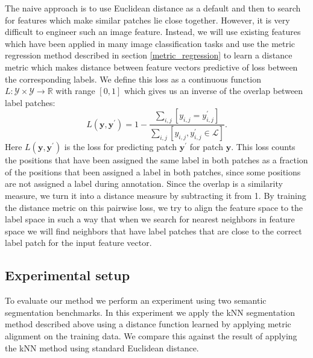 \documentclass[a4paper,titlepage]{article}
\renewcommand{\vec}[1]{\mathbf{#1}}
\begin{document}
The naive approach is to use Euclidean distance as a default and then to search for features which make similar patches lie close together. However, it is very difficult to engineer such an image feature. Instead, we will use existing features which have been applied in many image classification tasks and use the metric regression method described in section \ref{metric_regression} to learn a distance metric which makes distance between feature vectors predictive of loss between the corresponding labels. We define this loss as a continuous function $L: \mathcal{Y} \times \mathcal{Y} \rightarrow \mathbb{R}$ with range $[0,1]$ which gives us an inverse of the overlap between label patches:
\begin{equation}
L(\vec{y}, \vec{y}^\prime) = 1 - \frac{\sum_{i,j} \left [ y_{i,j} = y^\prime_{i,j}\right]}{\sum_{i,j} \left [y_{i,j}, y^\prime_{i,j} \in \mathcal{L}\right ]}.
\label{eq:patch_loss}
\end{equation}
Here $L(\vec{y}, \vec{y}^\prime)$ is the loss for predicting patch $\vec{y}^\prime$ for patch $\vec{y}$. This loss counts the positions that have been assigned the same label in both patches as a fraction of the positions that been assigned a label in both patches, since some positions are not assigned a label during annotation. Since the overlap is a similarity measure, we turn it into a distance measure by subtracting it from 1. By training the distance metric on this pairwise loss, we try to align the feature space to the label space in such a way that when we search for nearest neighbors in feature space we will find neighbors that have label patches that are close to the correct label patch for the input feature vector.




\subsection{Experimental setup}

To evaluate our method we perform an experiment using two semantic segmentation benchmarks. In this experiment we apply the \ac{kNN} segmentation method described above using a distance function learned by applying metric alignment on the training data. We compare this against the result of applying the \ac{kNN} method using standard Euclidean distance.
\end{document}
